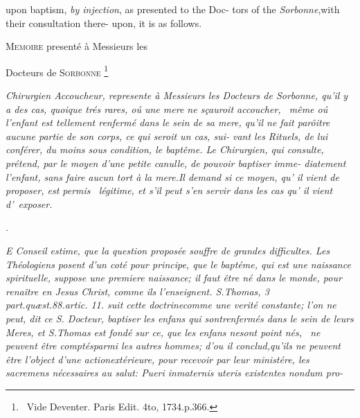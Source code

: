 \documentclass[twoside]{article}
\begin{document}
\medskip


\medskip

\bgroup\fontsize{8}{11}\selectfont
{}\break 
upon baptism, \textit{by injection}, as presented to the Doc-\break
tors of the \textit{Sorbonne},\tsk with their consultation there-\break
upon, it is as follows.\par\egroup

\newpage\null\smallskip
\centerline{\textsc{Memoire} presenté à Messieurs les}
\centerline{Docteurs de \textsc{Sorbonne} \footnote{\ Vide Deventer. Paris Edit. 4to,
1734.\@ p.\@ 366.}}

\bgroup\itshape\setlength{\baselineskip}{13pt}
Chirurgien Accoucheur, represente à\break 
Messieurs les Docteurs de \textnormal{Sorbonne},\break 
qu’il y a des cas, quoique trés rares, oú une\break
mere ne sçauroit accoucher, \et\ même oú\break
l’enfant est tellement renfermé dans le sein\break
de sa mere, qu’il ne fait parôitre aucune\break
partie de son corps, ce qui seroit un cas, sui-\break
vant les Rituels, de lui conférer, du moins\break
sous condition, le baptême. Le Chirurgien,\break
qui consulte, prétend, par le moyen d’une\break
\textnormal{petite canulle,} de pouvoir baptiser imme-\break
diatement l’enfant, sans faire aucun tort à\break
la mere.\tsh Il demand si ce moyen, qu’ il\break
vient de proposer, est permis \et\ légitime, et\break
s’il peut s’en servir dans les cas qu’ il vient\break
d’~exposer.\egroup

\bigskip{}
\newpage\null\smallskip
\centerline{.}

\bgroup\fontsize{9.6}{13}\selectfont\itshape
E Conseil estime, que la question proposée 
souffre de grandes difficultes. Les Théo\-logiens 
posent d’un coté pour principe, que\break
le baptéme, qui est une naissance spirituelle,\break
suppose une premiere naissance; il faut être né\break
dans le monde, pour renaître en \textnormal{Jesus Christ},\break
comme ils l’enseignent. S.\@ \textnormal{Thomas, 3 part.\break quæst.\@ 88.\@ artic.\@
11.\@} suit cette doctrine\break comme une verité constante\textnormal{;} l’on ne peut, dit ce S.
Docteur, baptiser les enfans qui sont\break renfermés dans le sein de leurs Meres,
et S.\break \textnormal{Thomas} est fondé sur ce, que les enfans ne\break sont
point nés, \et\ ne peuvent être comptés\break parmi les autres hommes; d’ou il
conclud,\break qu’ils ne peuvent être l’object d’une action\break extérieure, pour
recevoir par leur ministére, les sacremens nécessaires au salut: 
\textnormal{Pueri in\break maternis uteris existentes nondum pro-}\break
{}
\egroup
\end{document}
